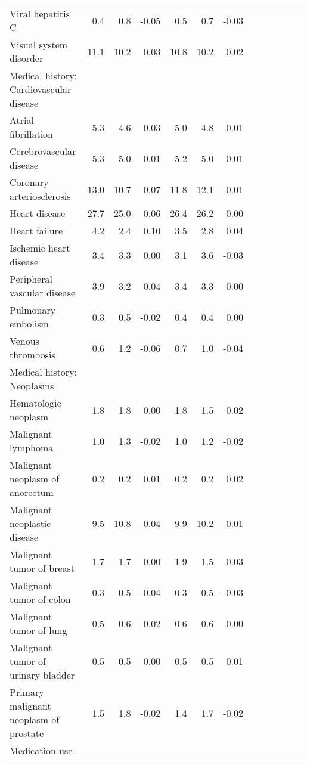 \documentclass[11pt,]{article}
\begin{document}
\begin{longtable}{lrrrrrrrrrrrr}
      Viral hepatitis C &  0.4 &  0.8 & -0.05 &  0.5 &  0.7 & -0.03 \\ 
      Visual system disorder & 11.1 & 10.2 &  0.03 & 10.8 & 10.2 &  0.02 \\ 
  Medical history: Cardiovascular disease &    &    &     &    &    &     \\ 
      Atrial fibrillation &  5.3 &  4.6 &  0.03 &  5.0 &  4.8 &  0.01 \\ 
      Cerebrovascular disease &  5.3 &  5.0 &  0.01 &  5.2 &  5.0 &  0.01 \\ 
      Coronary arteriosclerosis & 13.0 & 10.7 &  0.07 & 11.8 & 12.1 & -0.01 \\ 
      Heart disease & 27.7 & 25.0 &  0.06 & 26.4 & 26.2 &  0.00 \\ 
      Heart failure &  4.2 &  2.4 &  0.10 &  3.5 &  2.8 &  0.04 \\ 
      Ischemic heart disease &  3.4 &  3.3 &  0.00 &  3.1 &  3.6 & -0.03 \\ 
      Peripheral vascular disease &  3.9 &  3.2 &  0.04 &  3.4 &  3.3 &  0.00 \\ 
      Pulmonary embolism &  0.3 &  0.5 & -0.02 &  0.4 &  0.4 &  0.00 \\ 
      Venous thrombosis &  0.6 &  1.2 & -0.06 &  0.7 &  1.0 & -0.04 \\ 
  Medical history: Neoplasms &    &    &     &    &    &     \\ 
      Hematologic neoplasm &  1.8 &  1.8 &  0.00 &  1.8 &  1.5 &  0.02 \\ 
      Malignant lymphoma &  1.0 &  1.3 & -0.02 &  1.0 &  1.2 & -0.02 \\ 
      Malignant neoplasm of anorectum &  0.2 &  0.2 &  0.01 &  0.2 &  0.2 &  0.02 \\ 
      Malignant neoplastic disease &  9.5 & 10.8 & -0.04 &  9.9 & 10.2 & -0.01 \\ 
      Malignant tumor of breast &  1.7 &  1.7 &  0.00 &  1.9 &  1.5 &  0.03 \\ 
      Malignant tumor of colon &  0.3 &  0.5 & -0.04 &  0.3 &  0.5 & -0.03 \\ 
      Malignant tumor of lung &  0.5 &  0.6 & -0.02 &  0.6 &  0.6 &  0.00 \\ 
      Malignant tumor of urinary bladder &  0.5 &  0.5 &  0.00 &  0.5 &  0.5 &  0.01 \\ 
      Primary malignant neoplasm of prostate &  1.5 &  1.8 & -0.02 &  1.4 &  1.7 & -0.02 \\ 
  Medication use &    &    &     &    &    &     \\ 

\end{longtable}
\end{document}
